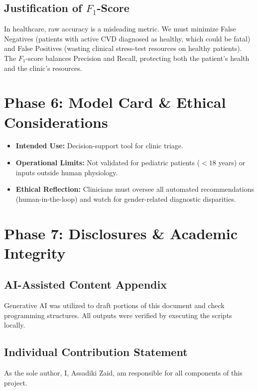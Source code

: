\documentclass[11pt,a4paper]{article}
\begin{document}
\subsection{Justification of $F_1$-Score}
In healthcare, raw accuracy is a misleading metric. We must minimize False Negatives (patients with active CVD diagnosed as healthy, which could be fatal) and False Positives (wasting clinical stress-test resources on healthy patients). The $F_1$-score balances Precision and Recall, protecting both the patient's health and the clinic's resources.

\section{Phase 6: Model Card \& Ethical Considerations}
\begin{itemize}
    \item \textbf{Intended Use:} Decision-support tool for clinic triage.
    \item \textbf{Operational Limits:} Not validated for pediatric patients ($<18$ years) or inputs outside human physiology.
    \item \textbf{Ethical Reflection:} Clinicians must oversee all automated recommendations (human-in-the-loop) and watch for gender-related diagnostic disparities.
\end{itemize}

\section{Phase 7: Disclosures \& Academic Integrity}
\subsection{AI-Assisted Content Appendix}
Generative AI was utilized to draft portions of this document and check programming structures. All outputs were verified by executing the scripts locally.

\subsection{Individual Contribution Statement}
As the sole author, I, Assadiki Zaid, am responsible for all components of this project.
\end{document}
